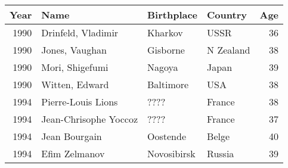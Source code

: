 \begin{tabular}{|r|l|l|l|r|} \hline

{Year} & {Name} & {Birthplace} & {Country}& {Age}\\
\hline

1990&Drinfeld, Vladimir  &Kharkov       &USSR      &36\\
1990&Jones, Vaughan      &Gisborne      &N Zealand &38\\
1990&Mori, Shigefumi     &Nagoya        &Japan     &39\\
1990&Witten, Edward      &Baltimore     &USA       &38\\
1994& Pierre-Louis Lions    & ????      &France    &38\\
1994&Jean-Chrisophe Yoccoz  &   ????    &France    &37\\
1994&Jean Bourgain       &Oostende       &Belge    &40\\
1994&Efim Zelmanov       &Novosibirsk    &Russia   &39\\
\hline
\end{tabular}

\bigskip
\bigskip

